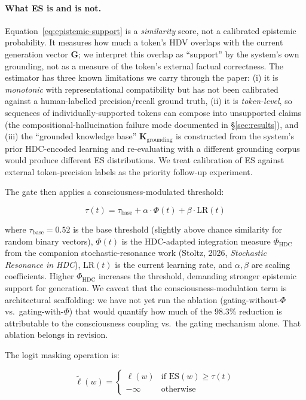 \documentclass[12pt,a4paper]{article}
\begin{document}
\paragraph{What ES is and is not.} Equation~\ref{eq:epistemic-support} is a \emph{similarity} score, not a calibrated epistemic probability. It measures how much a token's HDV overlaps with the current generation vector $\mathbf{G}$; we interpret this overlap as ``support'' by the system's own grounding, not as a measure of the token's external factual correctness. The estimator has three known limitations we carry through the paper: (i) it is \emph{monotonic} with representational compatibility but has not been calibrated against a human-labelled precision/recall ground truth, (ii) it is \emph{token-level}, so sequences of individually-supported tokens can compose into unsupported claims (the compositional-hallucination failure mode documented in \S\ref{sec:results}), and (iii) the ``grounded knowledge base'' $\mathbf{K}_{\text{grounding}}$ is constructed from the system's prior HDC-encoded learning and re-evaluating with a different grounding corpus would produce different ES distributions. We treat calibration of ES against external token-precision labels as the priority follow-up experiment.

The gate then applies a consciousness-modulated threshold:

\begin{equation}
\tau(t) = \tau_{\text{base}} + \alpha \cdot \Phi(t) + \beta \cdot \text{LR}(t)
\label{eq:threshold}
\end{equation}

where $\tau_{\text{base}} = 0.52$ is the base threshold (slightly above chance similarity for random binary vectors), $\Phi(t)$ is the HDC-adapted integration measure $\Phi_{\text{HDC}}$ from the companion stochastic-resonance work (Stoltz, 2026, \emph{Stochastic Resonance in HDC}), $\text{LR}(t)$ is the current learning rate, and $\alpha, \beta$ are scaling coefficients. Higher $\Phi_{\text{HDC}}$ increases the threshold, demanding stronger epistemic support for generation. We caveat that the consciousness-modulation term is architectural scaffolding: we have not yet run the ablation (gating-without-$\Phi$ vs.\ gating-with-$\Phi$) that would quantify how much of the 98.3\% reduction is attributable to the consciousness coupling vs.\ the gating mechanism alone. That ablation belongs in revision.

The logit masking operation is:

\begin{equation}
\tilde{\ell}(w) = \begin{cases}
\ell(w) & \text{if } \text{ES}(w) \geq \tau(t) \\
-\infty & \text{otherwise}
\end{cases}
\label{eq:masking}
\end{equation}
\end{document}
